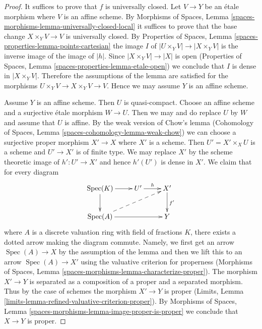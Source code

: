 \documentclass{stacks-project}
\theoremstyle{plain}
\theoremstyle{definition}
\theoremstyle{remark}
\numberwithin{equation}{subsection}
\def\Spec{\mathop{\mathrm{Spec}}}
\begin{document}
\begin{proof}
It suffices to prove that $f$ is universally closed.
Let $V \to Y$ be an \'etale morphism where $V$ is an affine scheme.
By Morphisms of Spaces, Lemma
\ref{spaces-morphisms-lemma-universally-closed-local}
it suffices to prove that the base change $X \times_Y V \to V$ is
universally closed. By Properties of Spaces, Lemma
\ref{spaces-properties-lemma-points-cartesian}
the image $I$ of $|U \times_Y V| \to |X \times_Y V|$
is the inverse image of the image of $|h|$. Since
$|X \times_Y V| \to |X|$ is open
(Properties of Spaces, Lemma \ref{spaces-properties-lemma-etale-open})
we conclude that $I$ is dense in $|X \times_Y V|$.
Therefore the assumptions of the lemma are
satisfied for the morphisms $U \times_Y V \to X \times_Y V \to V$.
Hence we may assume $Y$ is an affine scheme.

\medskip\noindent
Assume $Y$ is an affine scheme. Then $U$ is quasi-compact. Choose
an affine scheme and a surjective \'etale morphism $W \to U$.
Then we may and do replace $U$ by $W$ and assume that $U$ is affine.
By the weak version of Chow's lemma
(Cohomology of Spaces, Lemma \ref{spaces-cohomology-lemma-weak-chow})
we can choose a surjective proper morphism $X' \to X$
where $X'$ is a scheme. Then $U' = X' \times_X U$ is a scheme
and $U' \to X'$ is of finite type. We may replace $X'$ by
the scheme theoretic image of $h' : U' \to X'$ and hence $h'(U')$
is dense in $X'$. We claim that for every diagram
$$
\xymatrix{
\Spec(K) \ar[r] \ar[d] & U' \ar[r]^h & X' \ar[d]^{f'} \\
\Spec(A) \ar[rr] \ar@{-->}[rru] & & Y
}
$$
where $A$ is a discrete valuation ring with field of fractions $K$, there
exists a dotted arrow making the diagram commute. Namely, we first get an
arrow $\Spec(A) \to X$ by the assumption of the lemma and then we lift this
to an arrow $\Spec(A) \to X'$ using the valuative criterion for properness
(Morphisms of Spaces, Lemma \ref{spaces-morphisms-lemma-characterize-proper}).
The morphism $X' \to Y$ is separated
as a composition of a proper and a separated morphism.
Thus by the case of schemes the morphism $X' \to Y$ is proper
(Limits, Lemma
\ref{limits-lemma-refined-valuative-criterion-proper}).
By Morphisms of Spaces, Lemma
\ref{spaces-morphisms-lemma-image-proper-is-proper}
we conclude that $X \to Y$ is proper.
\end{proof}
\end{document}
